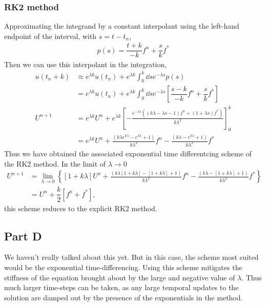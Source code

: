 \documentclass[12pt]{article}
\begin{document}
\subsubsection*{RK2 method}
Approximating the integrand by a constant interpolant using the left-hand endpoint of the interval, with $s=t-t_{n}$,
\begin{align}
p(s) = \dfrac{t+k}{-k}f^{n}+\dfrac{s}{k}f^{*}
\end{align} 
Then we can use this interpolant in the integration,
\begin{subequations}
    \begin{align}
    u(t_{n}+k) &\approx e^{\lambda k} u(t_{n}) + e^{\lambda k}\int_{0}^{k}\dd{s} e^{-\lambda s}p(s)\\
    &= e^{\lambda k} u(t_{n}) + e^{\lambda k}\int_{0}^{k}\dd{s} e^{-\lambda s}\left[\dfrac{s-k}{-k}f^{n}+\dfrac{s}{k}f^{*}\right]\\
    U^{n+1} &= e^{\lambda k} U^{n} + e^{\lambda k}\left[-\frac{e^{-\lambda s} ((k\lambda-\lambda s-1)f^{n} + (1+\lambda s)f^{*})}{k \lambda ^2}\right]_{0}^{k}\\
    &= e^{\lambda k} U^{n} + \frac{\left(k\lambda e^{k\lambda}-e^{k\lambda}+1\right)}{k\lambda^2}f^{n}-\frac{\left(k\lambda-e^{k\lambda}+1\right)}{k\lambda^2}f^{*}
    \end{align}
\end{subequations}
Thus we have obtained the associated exponential time differentcing scheme of the RK2 method. In the limit of $\lambda\to 0$ 
\begin{subequations}
    \begin{align}
        U^{n+1} &= \lim\limits_{\lambda\to 0}\left\{\left[1+k\lambda\right] U^{n} + \frac{\left(k\lambda \left[1+k\lambda\right]-\left[1+k\lambda\right]+1\right)}{k\lambda^2}f^{n}-\frac{\left(k\lambda-\left[1+k\lambda\right]+1\right)}{k\lambda^2}f^{*}\right\}\\
        &= U^{n} + \dfrac{k}{2}\left[f^{n}+f^{*}\right],
    \end{align}
\end{subequations}
this scheme reduces to the explicit RK2 method.

\subsection*{Part D}

We haven't really talked about this yet. But in this case, the scheme most suited would be the exponential time-differencing. Using this scheme mitigates the stiffness of the equation brought about by the large and negative value of $\lambda$. Thus much larger time-steps can be taken, as any large temporal updates to the solution are damped out by the presence of the exponentials in the method. 
\end{document}
